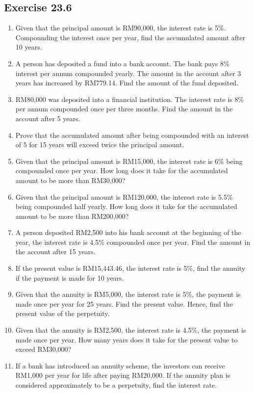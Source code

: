 \documentclass[12pt]{report}
\begin{document}
\subsection{Exercise 23.6}

\setlength{\columnseprule}{1pt}
\setlength{\columnsep}{24pt}
\begin{multicols}{2}
  \begin{enumerate}
    \item Given that the principal amount is RM90,000, the interest rate is 5\%.
          Compounding the interest once per year, find the accumulated amount after 10
          years.
    \item A person has deposited a fund into a bank account. The bank pays 8\% interest
          per annum compounded yearly. The amount in the account after 3 years has
          increased by RM779.14. Find the amount of the fund deposited.

    \item RM80,000 was deposited into a financial institution. The interest rate is 8\%
          per annum compounded once per three months. Find the amount in the account
          after 5 years.
    \item Prove that the accumulated amount after being compounded with an interest of
          $5$ for 15 years will exceed twice the principal amount.
    \item Given that the principal amount is RM15,000, the interest rate is 6\% being
          compounded once per year. How long does it take for the accumulated amount to
          be more than RM30,000?
    \item Given that the principal amount is RM120,000, the interest rate is 5.5\% being
          compounded half yearly. How long does it take for the accumulated amount to be
          more than RM200,000?
    \item A person deposited RM2,500 into his bank account at the beginning of the year,
          the interest rate is 4.5\% compounded once per year. Find the amount in the
          account after 15 years.
    \item If the present value is RM15,443.46, the interest rate is 5\%, find the annuity
          if the payment is made for 10 years.
    \item Given that the annuity is RM5,000, the interest rate is 5\%, the payment is
          made once per year for 25 years. Find the present value. Hence, find the
          present value of the perpetuity.
    \item Given that the annuity is RM2,500, the interest rate is 4.5\%, the payment is
          made once per year. How many years does it take for the present value to exceed
          RM30,000?
    \item If a bank has introduced an annuity scheme, the investors can receive RM1,000
          per year for life after paying RM20,000. If the annuity plan is considered
          approximately to be a perpetuity, find the interest rate.
  \end{enumerate}
\end{multicols}
\end{document}

